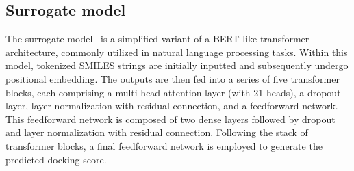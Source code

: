 \subsection{Surrogate model}\label{app:surrogate_model}
{The surrogate model~\citep{vasan23} is a simplified variant of a BERT-like transformer architecture, commonly utilized in natural language processing tasks. Within this model, tokenized SMILES strings are initially inputted and subsequently undergo positional embedding. The outputs are then fed into a series of five transformer blocks, each comprising a multi-head attention layer (with 21 heads), a dropout layer, layer normalization with residual connection, and a feedforward network. This feedforward network is composed of two dense layers followed by dropout and layer normalization with residual connection. Following the stack of transformer blocks, a final feedforward network is employed to generate the predicted docking score.

}























































































